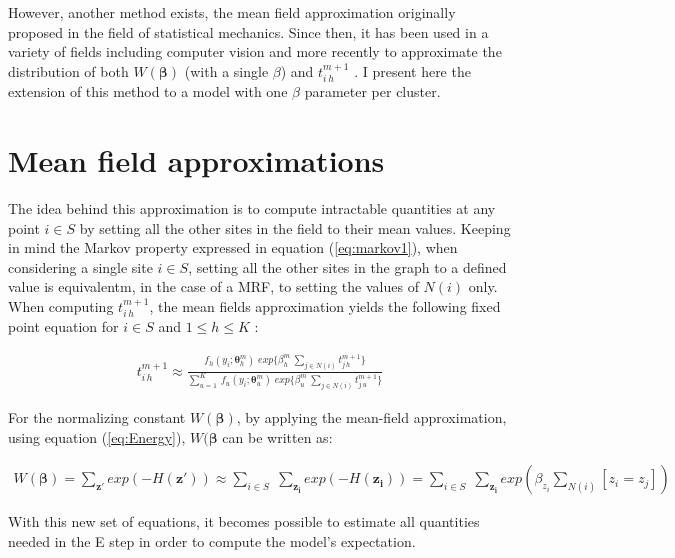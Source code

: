 However, another method exists, the mean field approximation originally proposed in the field of statistical mechanics. Since then, it has been used in a variety of fields including computer vision \cite{Yuille90} and more recently to approximate the distribution of both $W(\boldsymbol{\beta})$ (with a single $\beta$) and $t_{i\,h}^{m+1}$ \cite{Zhang92}. I present here the extension of this method to a model with one $\beta$ parameter per cluster.

\section{Mean field approximations}

The idea behind this approximation is to compute intractable quantities at any point $i \in S$ by setting all the other sites in the field to their mean values. Keeping in mind the Markov property expressed in equation (\ref{eq:markov1}), when considering a single site $i \in S$, setting all the other sites in the graph to a defined value is equivalentm, in the case of a MRF, to setting the values of $N(i)$ only.\\

When computing $t_{i\,h}^{m+1}$, the mean fields approximation yields the following fixed point equation for $i \in S$ and $1 \leq h \leq K$ \cite{Dang98}:

\begin{align}
\label{eq:fixedpoint}
t_{i\,h}^{m+1} \approx \frac{f_{h} (y_i;\boldsymbol{\theta}_{h}^m)\; exp\{\beta_h^m \: \sum_{j \in N(i)} t_{j\,h}^{m+1}\}}{\sum_{u=1}^K \: f_{u} (y_i;\boldsymbol{\theta}_{u}^m)\; exp\{\beta_u^m \: \sum_{j \in N(i)} t_{j\,u}^{m+1}\}}
\end{align}

For the normalizing constant $W(\boldsymbol{\beta})$, by applying the mean-field approximation, using equation (\ref{eq:Energy}), $W(\boldsymbol{\beta}$ can be written as:

\begin{align*}
W(\boldsymbol{\beta}) = \sum\limits_{\boldsymbol{z'}} exp(-H(\boldsymbol{z'})) \approx \sum\limits_{i \in S}\;\sum\limits_{\boldsymbol{z_i}} exp(-H(\boldsymbol{z_i})) = \sum\limits_{i \in S}\;\sum\limits_{\boldsymbol{z_i}} exp(\beta_{z_i}\sum\limits_{N(i)}[z_i=z_j])
\end{align*}

With this new set of equations, it becomes possible to estimate all quantities needed in the E step in order to compute the model's expectation.\\

